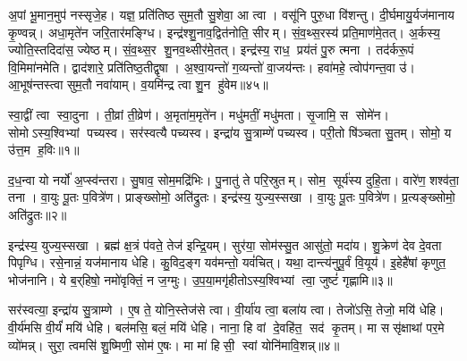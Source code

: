 अ॒पां भू॒मान॒मुप॑ नस्सृजे॒ह। यज्ञ॒ प्रति॑तिष्ठ सुम॒तौ सु॒शेवा॒ आ त्वा। वसू॑नि पुरु॒धा वि॑शन्तु। दी॒र्घमायु॒र्यज॑मानाय कृ॒ण्वन्न्। अधा॒मृते॑न जरि॒तार॑मङ्ग्धि। इन्द्र॑श्शु॒नाव॒द्वित॑नोति॒ सीरम्। सं॒व॒थ्स॒रस्य॑ प्रति॒माण॑मे॒तत्। अ॒र्कस्य॒ ज्योति॒स्तदिदा॑स॒ ज्येष्ठम्। सं॒व॒थ्स॒र शु॒नव॒थ्सीर॑मे॒तत्। इन्द्र॑स्य॒ राध॒ प्रय॑तं पु॒रु त्मना। तद॑र्करू॒पं वि॒मिमा॑नमेति। द्वाद॑शारे॒ प्रति॑तिष्ठ॒तीद्वृषा। अ॒श्वा॒यन्तो॑ ग॒व्यन्तो॑ वा॒जय॑न्तः। हवा॑महे॒ त्वोप॑गन्त॒वा उ॑। आ॒भूष॑न्तस्त्वा सुम॒तौ नवा॑याम्। व॒यमि॑न्द्र त्वा शु॒न हु॑वेम॥४५॥



\clearpage
{}
\setcounter{anuvakam}{0}
स्वा॒द्वीं त्वा स्वा॒दुना। ती॒व्रां ती॒व्रेण॑। अ॒मृता॑म॒मृते॑न। मधु॑मतीं॒ मधु॑मता। सृ॒जामि॒ स सोमे॑न। सोमोऽस्य॒श्विभ्यां पच्यस्व। सर॑स्वत्यै पच्यस्व। इन्द्रा॑य सु॒त्राम्णे॑ पच्यस्व। परी॒तो षि॑ञ्चता सु॒तम्। सोमो॒ य उ॑त्त॒म ह॒विः॥१॥

द॒ध॒न्वा यो नर्यो॑ अ॒प्स्व॑न्तरा। सु॒षाव॒ सोम॒मद्रि॑भिः। पु॒नातु॑ ते परि॒स्रुतम्। सोम॒ सूर्य॑स्य दुहि॒ता। वारे॑ण॒ शश्व॑ता॒ तना। वा॒युः पू॒तः प॒वित्रे॑ण। प्राङ्ख्सोमो॒ अति॑द्रुतः। इन्द्र॑स्य॒ युज्य॒स्सखा। वा॒युः पू॒तः प॒वित्रे॑ण। प्र॒त्यङ्ख्सोमो॒ अति॑द्रुतः॥२॥

इन्द्र॑स्य॒ युज्य॒स्सखा। ब्रह्म॑ क्ष॒त्रं प॑वते॒ तेज॑ इन्द्रि॒यम्। सुर॑या॒ सोम॑स्सु॒त आसु॑तो॒ मदा॑य। शु॒क्रेण॑ देव दे॒वता पिपृग्धि। रसे॒नान्नं॒ यज॑मानाय धेहि। कु॒विद॒ङ्ग यव॑मन्तो॒ यवं॑चित्। यथा॒ दान्त्य॑नुपू॒र्वं वि॒यूय॑। इ॒हेहै॑षां कृणुत॒ भोज॑नानि। ये ब॒र्‌हिषो॒ नमो॑वृक्तिं॒ न ज॒ग्मुः। उ॒प॒या॒मगृ॑हीतोऽस्य॒श्विभ्यां त्वा॒ जुष्टं॑ गृह्णामि॥३॥

सर॑स्वत्या॒ इन्द्रा॑य सु॒त्राम्णे। ए॒ष ते॒ योनि॒स्तेज॑से त्वा। वी॒र्या॑य त्वा॒ बला॑य त्वा। तेजो॑ऽसि॒ तेजो॒ मयि॑ धेहि। वी॒र्य॑मसि वी॒र्यं॑ मयि॑ धेहि। बल॑मसि॒ बलं॒ मयि॑ धेहि। नाना॒ हि वां दे॒वहि॑त॒ सद॑ कृ॒तम्। मा ससृ॑क्षाथां पर॒मे व्यो॑मन्न्। सुरा॒ त्वमसि॑ शु॒ष्मिणी॒ सोम॑ ए॒षः। मा मा॑ हिसी॒ स्वां योनि॑मावि॒शन्न्॥४॥


